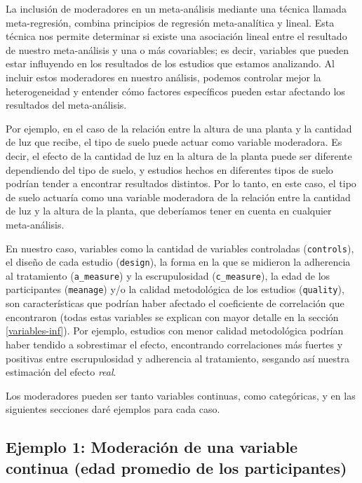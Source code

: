 \documentclass[
  bookmarksnumbered]{article}
\begin{document}
La inclusión de moderadores en un meta-análisis mediante una técnica llamada meta-regresión, combina principios de regresión meta-analítica y lineal. Esta técnica nos permite determinar si existe una asociación lineal entre el resultado de nuestro meta-análisis y una o más covariables; es decir, variables que pueden estar influyendo en los resultados de los estudios que estamos analizando. Al incluir estos moderadores en nuestro análisis, podemos controlar mejor la heterogeneidad y entender cómo factores específicos pueden estar afectando los resultados del meta-análisis.

Por ejemplo, en el caso de la relación entre la altura de una planta y la cantidad de luz que recibe, el tipo de suelo puede actuar como variable moderadora. Es decir, el efecto de la cantidad de luz en la altura de la planta puede ser diferente dependiendo del tipo de suelo, y estudios hechos en diferentes tipos de suelo podrían tender a encontrar resultados distintos. Por lo tanto, en este caso, el tipo de suelo actuaría como una variable moderadora de la relación entre la cantidad de luz y la altura de la planta, que deberíamos tener en cuenta en cualquier meta-análisis.

En nuestro caso, variables como la cantidad de variables controladas (\texttt{controls}), el diseño de cada estudio (\texttt{design}), la forma en la que se midieron la adherencia al tratamiento (\texttt{a\_measure}) y la escrupulosidad (\texttt{c\_measure}), la edad de los participantes (\texttt{meanage}) y/o la calidad metodológica de los estudios (\texttt{quality}), son características que podrían haber afectado el coeficiente de correlación que encontraron (todas estas variables se explican con mayor detalle en la sección \ref{variables-inf}). Por ejemplo, estudios con menor calidad metodológica podrían haber tendido a sobrestimar el efecto, encontrando correlaciones más fuertes y positivas entre escrupulosidad y adherencia al tratamiento, sesgando así nuestra estimación del efecto \emph{real}.

Los moderadores pueden ser tanto variables continuas, como categóricas, y en las siguientes secciones daré ejemplos para cada caso.

\hypertarget{ex-mod1}{%
\subsection{Ejemplo 1: Moderación de una variable continua (edad promedio de los participantes)}\label{ex-mod1}}
\end{document}
